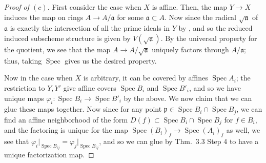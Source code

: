 \documentclass[10pt]{article}
\theoremstyle{definition}
\theoremstyle{remark}
\numberwithin{equation}{section}
\numberwithin{figure}{subsubsection}
\DeclareMathOperator{\Spec}{Spec}
\begin{document}
\begin{proof}[Proof of $(c)$]
  First consider the case when $X$ is affine. Then, the map $Y \to X$ induces the map on rings $A \to A/\mathfrak{a}$ for some $\mathfrak{a} \subset A$. Now since the radical $\sqrt{\mathfrak{a}}$ of $\mathfrak{a}$ is exactly the intersection of all the prime ideals in $Y$ by \cite[Prop.~1.14]{AM69}, and so the reduced induced subscheme structure is given by $V(\sqrt{\mathfrak{a}})$. By the universal property for the quotient, we see that the map $A \to A/\sqrt{\mathfrak{a}}$ uniquely factors through $A/\mathfrak{a}$; thus, taking $\Spec$ gives us the desired property.
  \par Now in the case when $X$ is arbitrary, it can be covered by affines $\Spec A_i$; the restriction to $Y,Y'$ give affine covers $\Spec B_i$ and $\Spec B'_i$, and so we have unique maps $\varphi_i\colon\Spec B_i \to \Spec B'_i$ by the above. We now claim that we can glue these maps together. Now since for any point $\mathfrak{p} \in \Spec B_i \cap \Spec B_j$, we can find an affine neighborhood of the form $D(f) \subset \Spec B_i \cap \Spec B_j$ for $f \in B_i$, and the factoring is unique for the map $\Spec (B_i)_f \to \Spec(A_i)_f$ as well, we see that $\varphi_i\vert_{\Spec B_{ij}} = \varphi_j\vert_{\Spec B_{ij}}$, and so we can glue by Thm.~3.3 Step 4 to have a unique factorization map.
\end{proof}
\end{document}
